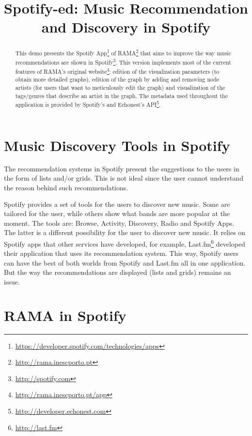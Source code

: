 \documentclass{article}
\title{Spotify-ed: Music Recommendation and Discovery in Spotify}
\begin{document}
%
\maketitle
%
\begin{abstract}
  This demo presents the Spotify App\footnote{\url{https://developer.spotify.com/technologies/apps}} of RAMA\footnote{\url{http://rama.inescporto.pt}} that aims to improve the way music recommendations are shown in Spotify\footnote{\url{http://spotify.com}}.
  This version implements most of the current features of RAMA's original website\footnote{\url{http://rama.inescporto.pt/app}}: edition of the visualization parameters (to obtain more detailed graphs), edition of the graph by adding and removing node artists (for users that want to meticulously edit the graph) and visualization of the tags/genres that describe an artist in the graph.
  The metadata used throughout the application is provided by Spotify's and Echonest's API\footnote{\url{http://developer.echonest.com}}.

\end{abstract}

  \section{Music Discovery Tools in Spotify} %
  \label{sec:spotify_tools}
  
    The recommendation systems in Spotify present the suggestions to the users in the form of lists and/or grids.
    This is not ideal since the user cannot understand the reason behind such recommendations.

    Spotify provides a set of tools for the users to discover new music.
    Some are tailored for the user, while others show what bands are more popular at the moment.
    The tools are: Browse, Activity, Discovery, Radio and Spotify Apps.
    The latter is a different possibility for the user to discover new music.
    It relies on Spotify apps that other services have developed, for example, Last.fm\footnote{\url{http://last.fm}} developed their application that uses its recommendation system. 
    This way, Spotify users can have the best of both worlds from Spotify and Last.fm all in one application.
    But the way the recommendations are displayed (lists and grids) remains an issue.


  \section{RAMA in Spotify} %
  \label{sec:rama}
  
\end{document}
